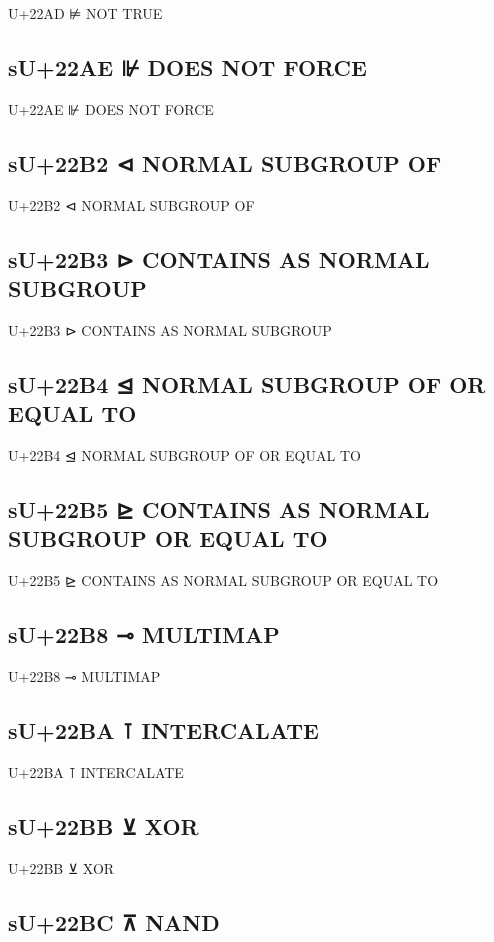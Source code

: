 U+22AD ⊭ NOT TRUE

\subsection{sU+22AE ⊮ DOES NOT FORCE}

U+22AE ⊮ DOES NOT FORCE

\subsection{sU+22B2 ⊲ NORMAL SUBGROUP OF}

U+22B2 ⊲ NORMAL SUBGROUP OF

\subsection{sU+22B3 ⊳ CONTAINS AS NORMAL SUBGROUP}

U+22B3 ⊳ CONTAINS AS NORMAL SUBGROUP

\subsection{sU+22B4 ⊴ NORMAL SUBGROUP OF OR EQUAL TO}

U+22B4 ⊴ NORMAL SUBGROUP OF OR EQUAL TO

\subsection{sU+22B5 ⊵ CONTAINS AS NORMAL SUBGROUP OR EQUAL TO}

U+22B5 ⊵ CONTAINS AS NORMAL SUBGROUP OR EQUAL TO

\subsection{sU+22B8 ⊸ MULTIMAP}

U+22B8 ⊸ MULTIMAP

\subsection{sU+22BA ⊺ INTERCALATE}

U+22BA ⊺ INTERCALATE

\subsection{sU+22BB ⊻ XOR}

U+22BB ⊻ XOR

\subsection{sU+22BC ⊼ NAND}

